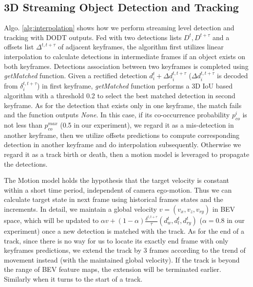 \documentclass[letterpaper, 10pt, conference]{ieeeconf}  %
\begin{document}

\subsection{3D Streaming Object Detection and Tracking}
Algo. \ref{alg:interpolation} shows how we perform streaming level detection and tracking with DODT outputs. Fed with two detections lists $D^t, D^{t+\tau}$ and a offsets list $\Delta^{t, t+\tau}$ of adjacent keyframes, the algorithm first utilizes linear interpolation to calculate detections in intermediate frames if an object exists on both keyframes. Detections association between two keyframes is completed using \textit{getMatched} function.  Given a rectified detection $d_i^t + \Delta d^{t, t+ \tau}_{i}$ ($\Delta d^{t, t+ \tau}_{i}$ is decoded from $\delta^{t, t+\tau}_i$) in first keyframe, \textit{getMatched} function performs a 3D IoU based algorithm with a threshold 0.2 to select the best matched detection in second keyframe. As for the detection that exists only in one keyframe, the match fails and the function outputs \textit{None}. In this case, if its co-occurrence probability $p_{co}^i$ is not less than $p_{co}^{max}$ (0.5 in our experiment), we regard it as a mis-detection in another keyframe, then we utilize offsets predictions to compute corresponding detection in another keyframe and do interpolation subsequently. Otherwise we regard it as a track birth or death, then a motion model is leveraged to propagate the detections.

The Motion model holds the hypothesis that the target velocity is constant within a short time period, independent of camera ego-motion. Thus we can calculate target state in next frame using historical frames states and the increments. In detail, we maintain a global velocity $v = (v_x, v_z, v_{ry})$ in BEV space, which will be updated to $\alpha v + (1-\alpha) \frac{\delta^{t, t+\tau}}{\tau}(d^t_w, d^t_l, d^t_{ry})$ ($\alpha = 0.8$ in our experiment) once a new detection is matched with the track. As for the end of a track, since there is no way for us to locate its exactly end frame with only keyframes predictions, we extend the track by 3 frames according to the trend of movement instead (with the maintained global velocity). If the track is beyond the range of BEV feature maps, the extension will be terminated earlier. Similarly when it turns to the start of a track.
\end{document}
